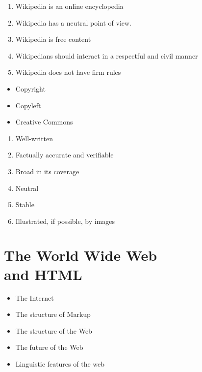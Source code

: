 \documentclass[a4paper,landscape,headrule,footrule,xetex]{foils}
\begin{document}
\begin{enumerate}
\item Wikipedia is an online encyclopedia
\item Wikipedia has a neutral point of view.
\item Wikipedia is free content
\item Wikipedians should interact in a respectful and civil manner
\item Wikipedia does not have firm rules
\end{enumerate}


\begin{itemize}
\item Copyright
\item Copyleft
\item Creative Commons
\end{itemize}


\begin{enumerate}
\item Well-written
\item Factually accurate and verifiable
\item Broad in its coverage
\item Neutral
\item Stable
\item Illustrated, if possible, by images
\end{enumerate}


\section{The World Wide Web \\ and HTML}
\MyLogo{}

\begin{itemize}
\item The Internet 
\item The structure of Markup
\item The structure of the Web
\item The future of the Web
\item Linguistic features of the web
\end{itemize}

\end{document}
